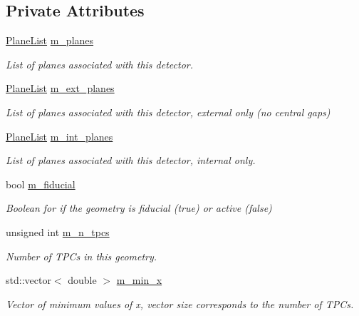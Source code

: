 \subsection*{Private Attributes}
\begin{DoxyCompactItemize}
\item 
\hyperlink{classcalib_1_1Geometry_a85d1d4140e153e7d0e423208954107aa}{Plane\-List} \hyperlink{classcalib_1_1Geometry_a8fd38a59fc353679755a7c08221cae77}{m\-\_\-planes}
\begin{DoxyCompactList}\small\item\em List of planes associated with this detector. \end{DoxyCompactList}\item 
\hyperlink{classcalib_1_1Geometry_a85d1d4140e153e7d0e423208954107aa}{Plane\-List} \hyperlink{classcalib_1_1Geometry_a2c963c48fd42a7fb53abb534771512f8}{m\-\_\-ext\-\_\-planes}
\begin{DoxyCompactList}\small\item\em List of planes associated with this detector, external only (no central gaps) \end{DoxyCompactList}\item 
\hyperlink{classcalib_1_1Geometry_a85d1d4140e153e7d0e423208954107aa}{Plane\-List} \hyperlink{classcalib_1_1Geometry_a7c58e24298b07a7d2feacf2ab5d33b04}{m\-\_\-int\-\_\-planes}
\begin{DoxyCompactList}\small\item\em List of planes associated with this detector, internal only. \end{DoxyCompactList}\item 
bool \hyperlink{classcalib_1_1Geometry_a5b77d43d5d1eab632f65c7615663015f}{m\-\_\-fiducial}
\begin{DoxyCompactList}\small\item\em Boolean for if the geometry is fiducial (true) or active (false) \end{DoxyCompactList}\item 
unsigned int \hyperlink{classcalib_1_1Geometry_aeeec1ee84e1de131ef1a98a042dd7a71}{m\-\_\-n\-\_\-tpcs}
\begin{DoxyCompactList}\small\item\em Number of T\-P\-Cs in this geometry. \end{DoxyCompactList}\item 
std\-::vector$<$ double $>$ \hyperlink{classcalib_1_1Geometry_a1708fea3fa3434776d6bfdd1c453a1ec}{m\-\_\-min\-\_\-x}
\begin{DoxyCompactList}\small\item\em Vector of minimum values of x, vector size corresponds to the number of T\-P\-Cs. \end{DoxyCompactList}\item 

\end{DoxyCompactItemize}
